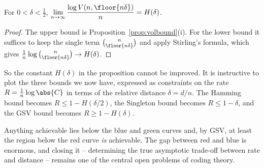 \begin{lemma}
	For $0 < \delta < \tfrac12$, $\displaystyle \lim_{n \to \infty}\frac{\log V(n,\floor{n\delta})}{n} = H(\delta)$.
\end{lemma}

\begin{proof}
	The upper bound is Proposition~\ref{prop:volbound}(i). For the lower bound it suffices to keep the single term $\binom{n}{\floor{n\delta}}$ and apply Stirling's formula, which gives $\frac1n\log\binom{n}{\floor{n\delta}} \to H(\delta)$.
\end{proof}

So the constant $H(\delta)$ in the proposition cannot be improved. It is instructive to plot the three bounds we now have, expressed as constraints on the rate $R = \frac1n \log \abs{C}$ in terms of the relative distance $\delta = d/n$. The Hamming bound becomes $R \le 1 - H(\delta/2)$, the Singleton bound becomes $R \le 1 - \delta$, and the GSV bound becomes $R \ge 1 - H(\delta)$.

\begin{center}
\end{center}

Anything achievable lies below the blue and green curves and, by GSV, at least the region below the red curve \emph{is} achievable. The gap between red and blue is enormous, and closing it -- determining the true asymptotic trade-off between rate and distance -- remains one of the central open problems of coding theory.

